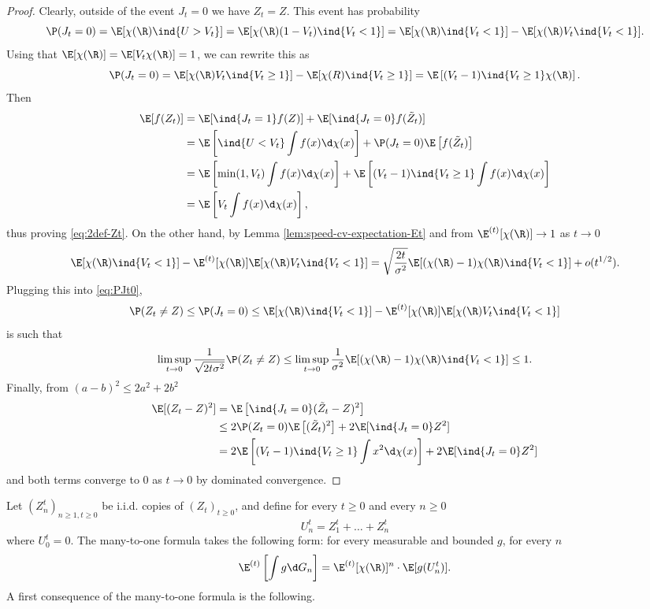 \documentclass[10pt,a4paper]{article}
\begin{document}
\begin{proof}
Clearly, outside of the event $J_t=0$ we have $Z_t = Z$. This event has probability
\begin{equation}\label{eq:PJt0}
\P(J_t=0) = \E[\chi(\R) \ind{U>V_t}] = \E[\chi(\R) (1-V_t)\ind{V_t<1}] = \E[\chi(\R)\ind{V_t<1}] - \E[\chi(\R) V_t \ind{V_t<1}] .
\end{equation}
Using that $\E[\chi(\R)] = \E[V_t\chi(\R)] = 1$, we can rewrite this as 
\[ \P(J_t=0) = \E[\chi(\R) V_t \ind{V_t\geq 1}] - \E[\chi(R) \ind{V_t\geq 1}] = \E\left[ (V_t-1) \ind{V_t\geq 1} \chi(\R) \right] . \]
Then
\begin{align*}
\E[f(Z_t)] &= \E[\ind{J_t=1} f(Z)] + \E[\ind{J_t=0} f(\tilde Z_t)] \\
&= \E\left[ \ind{U<V_t} \int f(x)\d\chi(x) \right] + \P(J_t=0) \E\left[ f(\tilde Z_t) \right] \\
&= \E\left[ \min(1, V_t) \int f(x)\d\chi(x) \right] + \E\left[ (V_t-1) \ind{V_t\geq 1} \int f(x)\d\chi(x) \right] \\
&= \E\left[V_t \int f(x) \d\chi(x) \right] ,
\end{align*}
thus proving \eqref{eq:2def-Zt}. On the other hand, by Lemma \ref{lem:speed-cv-expectation-Et} and from $\E^{(t)}[\chi(\R)]\to 1$ as $t\to 0$
\[ \E[\chi(\R)\ind{V_t<1}] -  \E^{(t)}[\chi(\R)] \E[\chi(\R) V_t \ind{V_t<1}] = \sqrt{\frac{2t}{\sigma^2}} \E[(\chi(\R)-1)\chi(\R) \ind{V_t<1}] + o(t^{1/2}) . \]
Plugging this into \eqref{eq:PJt0}, 
\begin{equation*}
\P(Z_t \neq Z) \leq \P(J_t =0) \leq \E[\chi(\R)\ind{V_t<1}] - \E^{(t)}[\chi(\R)]\E[\chi(\R) V_t \ind{V_t<1}]
\end{equation*}
is such that 
\[ \limsup_{t\to 0} \frac{1}{\sqrt{2t \sigma^2}} \P(Z_t \neq Z) \leq \limsup_{t\to 0}  \frac{1}{\sigma^2} \E[(\chi(\R)-1)\chi(\R) \ind{V_t<1}] \leq 1 . \]
Finally, from $(a-b)^2 \leq 2a^2 + 2b^2$
\begin{align*}
\E[ (Z_t-Z)^2] &= \E\left[ \ind{J_t=0} (\tilde Z_t-Z)^2 \right] \\
&\leq 2\P(Z_t=0) \E\left[ (\tilde Z_t)^2 \right] + 2\E[\ind{J_t=0} Z^2] \\
&= 2\E\left[ (V_t-1) \ind{V_t\geq 1} \int x^2 \d\chi(x) \right] + 2\E[\ind{J_t=0} Z^2]
\end{align*}
and both terms converge to $0$ as $t\to 0$ by dominated convergence. 
\end{proof}



Let $(Z_n^{t})_{n\geq 1, t\geq 0}$ be i.i.d. copies of $(Z_t)_{t\geq 0}$, and define for every $t\geq 0$ and every $n\geq 0$
\begin{equation}\label{eq:def-Unt}
U_n^t = Z_1^t + \dots + Z_n^t
\end{equation}
where $U_0^t = 0$. 
The many-to-one formula takes the following form: for every measurable and bounded $g$, for every $n$
\begin{equation}\label{eq:many-to-one-chiR}
\E^{(t)}\left[\int g \d G_n\right] = \E^{(t)}[\chi(\R)]^n \cdot \E[g(U_n^t)] . 
\end{equation} 
A first consequence of the many-to-one formula is the following.
\end{document}
